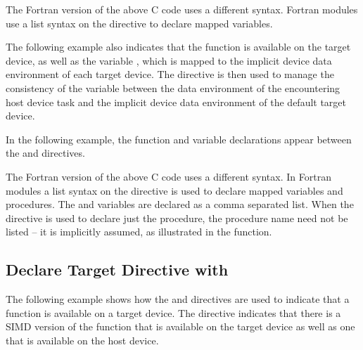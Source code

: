 
The Fortran version of the above C code uses a different syntax. Fortran modules 
use a list syntax on the  directive to declare
mapped variables.


The following example also indicates that the function  is available on the 
target device, as well as the variable , which is mapped to the implicit device 
data environment of each target device. The  directive
is then used to manage the consistency of the variable  between the data environment 
of the encountering host device task and the implicit device data environment of 
the default target device.

In the following example, the function and variable declarations appear between 
the  and 
directives.


The Fortran version of the above C code uses a different syntax. In Fortran modules 
a list syntax on the  directive is used to declare 
mapped variables and procedures. The  and  variables are declared as a comma 
separated list. When the  directive is used to
declare just the procedure, the procedure name need not be listed -- it is implicitly 
assumed, as illustrated in the  function.


\subsection{Declare Target Directive with }
\label{subsec:declare_target_simd}




The following example shows how the  and
 directives are used to indicate that a function
is available on a target device. The  directive indicates
that there is a SIMD version of the function  that is available on the target 
device as well as one that is available on the host device.

